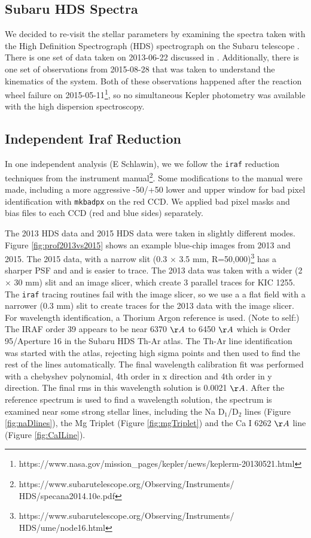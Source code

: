 \documentclass[twocolumn]{aastex61}
\newcommand{\shStar}{KIC 1255}
\begin{document}
\subsection{Subaru HDS Spectra}

We decided to re-visit the stellar parameters by examining the spectra taken with the High Definition Spectrograph (HDS) spectrograph on the Subaru telescope \citep{noguchi2002hds}.
There is one set of data taken on 2013-06-22 discussed in \citet{kawahara2013starspots}.
Additionally, there is one set of observations from 2015-08-28 that was taken to understand the kinematics of the system.
Both of these observations happened after the reaction wheel failure on 2015-05-11\footnote{https://www.nasa.gov/mission\_pages/kepler/news/keplerm-20130521.html}, so no simultaneous Kepler photometry was available with the high dispersion spectroscopy.

\subsection{Independent Iraf Reduction}

In one independent analysis (E Schlawin), we we follow the \texttt{iraf} reduction techniques from the instrument manual\footnote{https://www.subarutelescope.org/Observing/Instruments/\\HDS/specana2014.10e.pdf}.
Some modifications to the manual were made, including a more aggressive -50/+50 lower and upper window for bad pixel identification with \texttt{mkbadpx} on the red CCD.
We applied bad pixel masks and bias files to each CCD (red and blue sides) separately.

The 2013 HDS data and 2015 HDS data were taken in slightly different modes.
Figure \ref{fig:prof2013vs2015} shows an example blue-chip images from 2013 and 2015.
The 2015 data, with a narrow slit (0.3 $\times$ 3.5 mm, R=50,000)\footnote{https://www.subarutelescope.org/Observing/Instruments/\\HDS/ume/node16.html} has a sharper PSF and and is easier to trace.
The 2013 data was taken with a wider (2 $\times$ 30 mm) slit and an image slicer, which create 3 parallel traces for \shStar.
The \texttt{iraf} tracing routines fail with the image slicer, so we use a a flat field with a narrower (0.3 mm) slit to create traces for the 2013 data with the image slicer.
For wavelength identification, a Thorium Argon reference is used.
(Note to self:) The IRAF order 39 appears to be near 6370 $\AA$ to 6450 $\AA$ which is Order 95/Aperture 16 in the Subaru HDS Th-Ar atlas.
The Th-Ar line identification was started with the atlas, rejecting high sigma points and then used to find the rest of the lines automatically.
The final wavelength calibration fit was performed with a chebyshev polynomial, 4th order in x direction and 4th order in y direction.
The final rms in this wavelength solution is 0.0021 $\AA$.
After the reference spectrum is used to find a wavelength solution, the spectrum is examined near some strong stellar lines, including the Na D$_1$/D$_2$ lines (Figure \ref{fig:naDlines}), the Mg Triplet (Figure \ref{fig:mgTriplet}) and the Ca I 6262 $\AA$ line (Figure \ref{fig:CaILine}).
\end{document}
